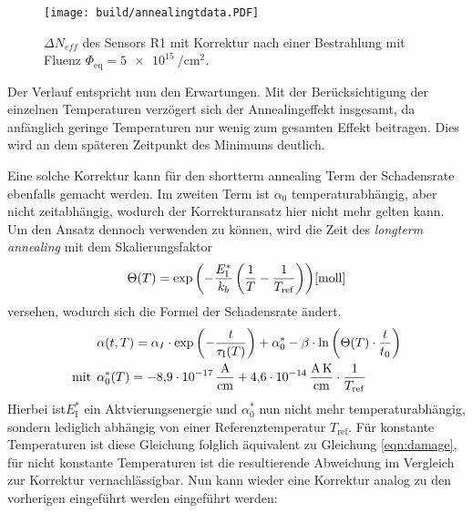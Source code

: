 \begin{figure}[htp]
    \texttt{[image: build/annealingtdata.PDF]}
\caption{$\Delta N_{eff}$ des Sensors R1 mit Korrektur nach einer Bestrahlung mit Fluenz $\Phi_{\mathrm{eq}} = \SI{5e15}{\per\centi\meter\squared}.$}
\label{fig:korrektur_N_eff}
\end{figure}


Der Verlauf entspricht nun den Erwartungen. Mit der Berücksichtigung
der einzelnen Temperaturen verzögert sich der Annealingeffekt insgesamt, da anfänglich
geringe Temperaturen nur wenig zum gesamten Effekt beitragen. Dies wird
an dem späteren Zeitpunkt des Minimums deutlich.

Eine solche Korrektur kann für den shortterm annealing Term der Schadensrate ebenfalls gemacht werden.
Im zweiten Term ist $\alpha_{0}$ temperaturabhängig, aber nicht zeitabhängig,
wodurch der Korrekturansatz hier nicht mehr gelten kann. Um den Ansatz dennoch
verwenden zu können, wird die Zeit des \textit{longterm annealing} mit dem
Skalierungsfaktor
\begin{align}
  \Theta(T) =  \exp{\left(-\frac{E_{\mathrm{I}}^*}{k_b}\left(\frac{1}{T}-\frac{1}{T_{\mathrm{ref}}}\right)\right)} \text{\cite{moll}} \\
\end{align}
versehen, wodurch sich die Formel der Schadensrate ändert.
\begin{align}
  &\alpha(t, T) = \alpha_I \cdot \exp{\left(-\frac{t}{\tau_{\mathrm{I}}(T)}\right)} + \alpha_{\mathrm{0}}^{*} -\beta \cdot \ln{\left(\Theta(T) \cdot \frac{t}{t_{\mathrm{0}}}\right)} \\
  \medskip
  \text{mit}\:\: &\alpha^*_{\mathrm{0}}(T) = \SI{-8.9e-17}{\ampere\per\centi\meter} + \SI{4.6e-14}{\ampere\kelvin\per\centi\meter} \cdot \frac{1}{T_{\mathrm{ref}}}
\end{align}
Hierbei ist$E_{\mathrm{I}}^*$ ein Aktvierungsenergie und $\alpha^*_{0}$ nun nicht mehr temperaturabhängig,
sondern lediglich abhängig von einer Referenztemperatur $T_{\mathrm{ref}}$. Für konstante Temperaturen
ist diese Gleichung folglich äquivalent zu Gleichung \ref{eqn:damage}, für nicht
konstante Temperaturen ist die resultierende Abweichung im Vergleich zur Korrektur vernachlässigbar.
Nun kann wieder eine Korrektur analog zu den vorherigen eingeführt werden eingeführt werden:

